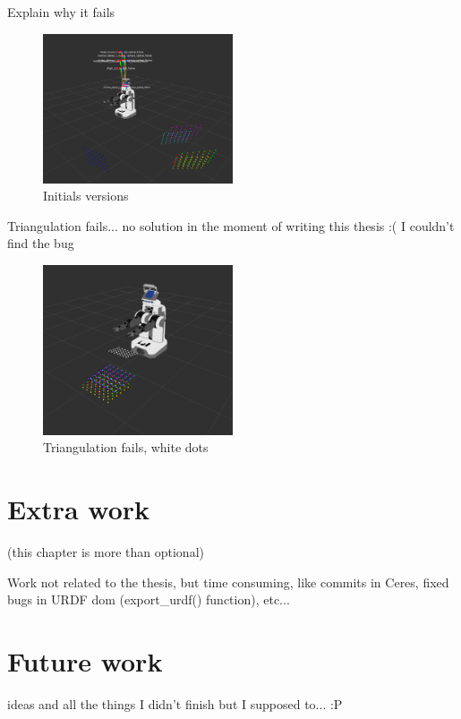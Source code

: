 Explain why it fails
\begin{figure}[!htbp]
 \centering
 \includegraphics[width=0.5\textwidth]{images/screenshots/optimization_failer02_2.png}
 \caption{Initials versions}
 \label{fig:optimization_failer}
\end{figure}


Triangulation fails... no solution in the moment of writing this thesis :( I couldn't find the bug
\begin{figure}[!htbp]
 \centering
 \includegraphics[width=0.5\textwidth]{images/screenshots/triangulation_fails.png}
 \caption{Triangulation fails, white dots}
 \label{fig:triangulation_fails}
\end{figure}




\chapter{Extra work}
\label{cha:extra}

(this chapter is more than optional)

Work not related to the thesis, but time consuming, like commits in Ceres, fixed bugs in URDF dom (export\_urdf() function), etc...



\chapter{Future work}
\label{cha:future}

ideas and all the things I didn't finish but I supposed to... :P
